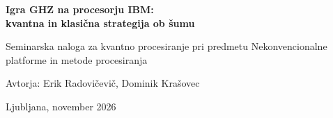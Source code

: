 \makeatletter


\renewcommand\thesection{\@arabic\c@section}
\renewcommand\thesubsection{\thesection.\@arabic\c@subsection}
\renewcommand\theequation{\@arabic\c@equation}
\renewcommand\thefigure{\@arabic\c@figure}
\renewcommand\thetable{\@arabic\c@table}

\def\title#1{}
\def\titlerunning#1{}
\def\author#1{}
\def\maketitle{}

\let\cleardoublepage\clearpage
\let\clearemptydoublepage\clearpage
\let\startnewpage\clearpage
\let\ps@bchap\ps@plain
\renewcommand\backmatter{\clearpage}

\makeatother

\thispagestyle{empty}
\begin{center}
\vspace*{2.5cm}
{\LARGE\bfseries Igra GHZ na procesorju IBM:\\[4pt] kvantna in klasična strategija ob šumu\par}
\vspace{1.2cm}
{\large Seminarska naloga za kvantno procesiranje pri predmetu Nekonvencionalne platforme in metode procesiranja\par}
\end{center}
\vspace{5cm}
\begin{flushright}
Avtorja: Erik Radovičevič, Dominik Krašovec
\end{flushright}
\vfill
\begin{center}
Ljubljana, november 2026
\end{center}
\clearpage

\tableofcontents
\thispagestyle{empty}
\clearpage

\pagestyle{plain}
